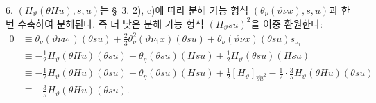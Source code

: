 
6. $(H_\vartheta(\theta Hu),s,u)$는 \S\ 3. 2), c)에 따라 분해 가능 형식 $(\theta_\nu(\vartheta \nu x),s,u)$과 한 번 수축하여 분해된다. 즉 더 낮은 분해 가능 형식 $(H_\vartheta su)^2$을 이중 환원한다:
\[
\begin{aligned}
0&\equiv \theta_\nu(\vartheta\nu\nu_1)(\theta su)+\frac23\theta_\nu^2(\vartheta \nu_1 x)(\theta su)+\theta_\nu(\vartheta \nu x)(\theta su)s_{\nu_1}\\
&\equiv -\frac12H_\vartheta(\theta Hu)(\theta su)+\theta_\eta(\theta su)(Hsu)+\frac12H_\vartheta(\theta su)(Hsu)\\
&\equiv -\frac12H_\vartheta(\theta Hu)(\theta su)+\theta_\eta(\theta su)(Hsu)+\frac12[H_\vartheta]_{\widehat{su}^2}-\frac12\cdot\frac35H_\vartheta(\theta Hu)(\theta su)\\
&\equiv -\frac35H_\vartheta(\theta Hu)(\theta su).
\end{aligned}
\]
